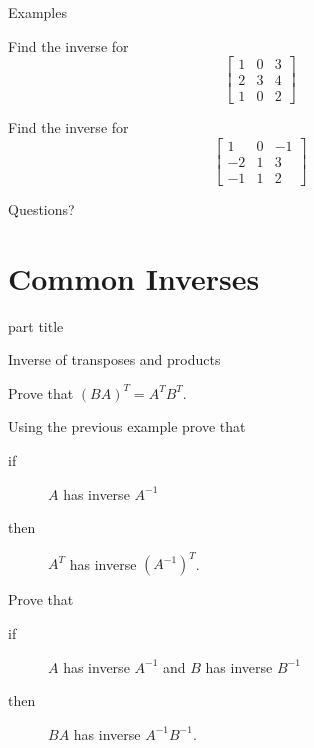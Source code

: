 \documentclass{beamer}
\begin{document}
\begin{frame}{Examples}
  \begin{example}
    Find the inverse for
    \begin{equation*}
      \left[
        \begin{array}{ccc}
          1&0&3\\
          2&3&4\\
          1&0&2
        \end{array}
      \right]
    \end{equation*}
  \end{example}
  \begin{example}
    Find the inverse for
    \begin{equation*}
      \left[
        \begin{array}{ccc}
          1&0&-1\\
          -2&1&3\\
          -1&1&2
        \end{array}
      \right]
    \end{equation*}
  \end{example}
\end{frame}

\begin{frame}
  Questions?
\end{frame}

\section{Common Inverses}

\begin{frame}
  \begin{beamercolorbox}[sep=12pt,center]{part title}
    \insertsection\par
  \end{beamercolorbox}
\end{frame}

\begin{frame}{Inverse of transposes and products}
  \begin{example}
    Prove that $(BA)^T = A^T B^T$.
  \end{example}\vfill
  \begin{example}
    Using the previous example prove that
    \begin{description}
    \item [if] $A$ has inverse $A^{-1}$
    \item [then] $A^T$ has inverse $(A^{-1})^T$.
    \end{description}
  \end{example}\vfill
  \begin{example}
    Prove that
    \begin{description}
    \item [if] $A$ has inverse $A^{-1}$ and $B$ has inverse $B^{-1}$
    \item [then] $BA$ has inverse $A^{-1}B^{-1}$.
    \end{description}
  \end{example}
\end{frame}
\end{document}
